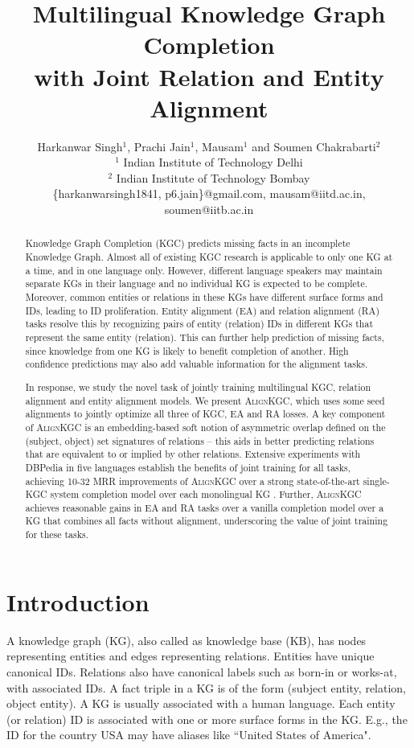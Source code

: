 \documentclass[11pt]{article}
\title{Multilingual Knowledge Graph Completion
\\with Joint Relation and Entity Alignment}
\author{
Harkanwar Singh$^{1}$, 
{Prachi Jain}$^1$, 
Mausam$^1$ {\normalfont and} 
Soumen Chakrabarti$^2$
\\ 
$^1$ Indian Institute of Technology Delhi \\
$^2$ Indian Institute of Technology Bombay  \\
\{harkanwarsingh1841, p6.jain\}@gmail.com,
mausam@iitd.ac.in,
soumen@iitb.ac.in
}
\def\shortname{\textsc{Align\-KGC}}
\begin{document}
\maketitle

\begin{abstract}
Knowledge Graph Completion (KGC) predicts missing facts in an incomplete Knowledge Graph. Almost all of existing KGC research is applicable to only one KG at a time, and in one language only. However, different language speakers may maintain separate KGs in their language and no individual KG is expected to be complete.  Moreover, common entities or relations in these KGs have different surface forms and IDs, leading to ID proliferation. Entity alignment (EA) and relation alignment (RA) tasks resolve this by recognizing pairs of entity (relation) IDs in different KGs that represent the same entity (relation). This can further help prediction of missing facts, since knowledge from one KG is likely to benefit completion of another. High confidence predictions may also add valuable information for the alignment tasks.

In response, we study the novel task of jointly training multilingual KGC, relation alignment and entity alignment models. We present \shortname, which uses some seed alignments to jointly optimize all three of KGC, EA and RA losses. A key component of \shortname{} is an embedding-based soft notion of asymmetric overlap defined on the (subject, object) set signatures of relations -- this aids in better predicting relations that are equivalent to or implied by other relations.  Extensive experiments with DBPedia in five languages establish the benefits of joint training for all tasks, achieving 10-32 MRR improvements of \shortname{} over a strong state-of-the-art single-KGC system completion model over each monolingual KG . Further, \shortname{} achieves reasonable gains in EA and RA tasks over a vanilla completion model over a KG that combines all facts without alignment, underscoring the value of joint training for these tasks.
     


\end{abstract}


\section{Introduction}
\label{sec:Intro}

A knowledge graph (KG), also called as knowledge base (KB), has nodes representing entities and edges representing relations.  Entities have unique canonical IDs.  Relations also have canonical labels such as born-in or works-at, with associated IDs.  A fact triple in a KG is of the form (subject entity, relation, object entity).  A KG is usually associated with a human language.
Each entity (or relation) ID is associated with one or more surface forms in the KG. E.g., the ID for the country USA may have aliases like ``United States of America". 
\end{document}
